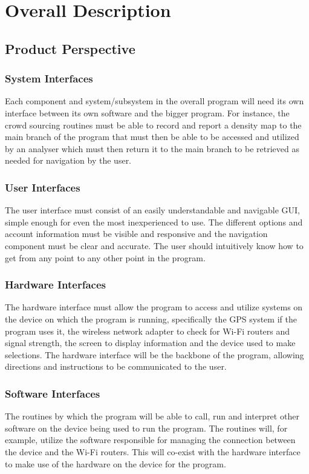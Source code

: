 \documentclass[a4paper,10pt]{article}
\begin{document}
\section{Overall Description}

	\subsection{Product Perspective}
	
		\subsubsection{System Interfaces}
			Each component and system/subsystem in the overall program will need its own interface between its own				software and the bigger program. For instance, the crowd sourcing routines must be able to record and report a			density map to the main branch of the program that must then be able to be accessed and utilized by an analyser			which must then return it to the main branch to be retrieved as needed for navigation by the user.
		\subsubsection{User Interfaces}
			The user interface must consist of an easily understandable and navigable GUI, simple enough for even the				most inexperienced to use. The different options and account information must be visible and responsive and the			navigation component must be clear and accurate. The user should intuitively know how to get from any point to			any other point in the program.
		\subsubsection{Hardware Interfaces}
			The hardware interface must allow the program to access and utilize systems on the device on which the program			is running, specifically the GPS system if the program uses it, the wireless network adapter to check for Wi-Fi			routers and signal strength, the screen to display information and the device used to make selections. The				hardware interface will be the backbone of the program, allowing directions and instructions to be communicated			to the user.
		\subsubsection{Software Interfaces}
			The routines by which the program will be able to call, run and interpret other software on the device being				used to run the program. The routines will, for example, utilize the software responsible for managing the 				connection between the device and the Wi-Fi routers. This will co-exist with the hardware interface to make use			of the hardware on the device for the program.
\end{document}
